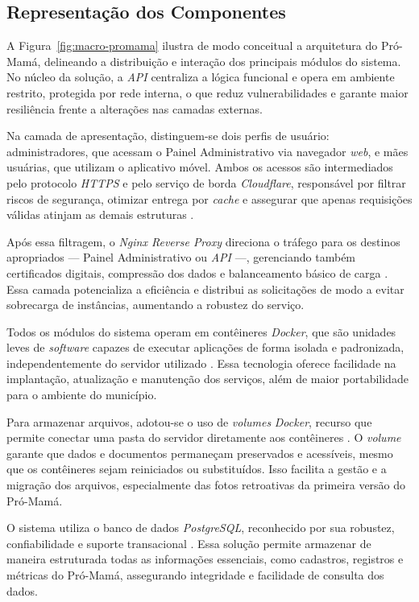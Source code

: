 \subsection{Representação dos Componentes}

A Figura~\ref{fig:macro-promama} ilustra de modo conceitual a arquitetura do Pró-Mamá, delineando a distribuição e interação dos principais módulos do sistema. No núcleo da solução, a \emph{API} centraliza a lógica funcional e opera em ambiente restrito, protegida por rede interna, o que reduz vulnerabilidades e garante maior resiliência frente a alterações nas camadas externas.

Na camada de apresentação, distinguem-se dois perfis de usuário: administradores, que acessam o Painel Administrativo via navegador \emph{web}, e mães usuárias, que utilizam o aplicativo móvel. Ambos os acessos são intermediados pelo protocolo \emph{HTTPS} e pelo serviço de borda \emph{Cloudflare}, responsável por filtrar riscos de segurança, otimizar entrega por \emph{cache} e assegurar que apenas requisições válidas atinjam as demais estruturas \cite{cloudflarefundamentals}.

Após essa filtragem, o \emph{Nginx Reverse Proxy} direciona o tráfego para os destinos apropriados — Painel Administrativo ou \emph{API} —, gerenciando também certificados digitais, compressão dos dados e balanceamento básico de carga \cite{nginxloadbalancer}. Essa camada potencializa a eficiência e distribui as solicitações de modo a evitar sobrecarga de instâncias, aumentando a robustez do serviço.

Todos os módulos do sistema operam em contêineres \emph{Docker}, que são unidades leves de \emph{software} capazes de executar aplicações de forma isolada e padronizada, independentemente do servidor utilizado \cite{dockerdocs}. Essa tecnologia oferece facilidade na implantação, atualização e manutenção dos serviços, além de maior portabilidade para o ambiente do município.

Para armazenar arquivos, adotou-se o uso de \emph{volumes} \emph{Docker}, recurso que permite conectar uma pasta do servidor diretamente aos contêineres \cite{dockerdocs}. O \emph{volume} garante que dados e documentos permaneçam preservados e acessíveis, mesmo que os contêineres sejam reiniciados ou substituídos. Isso facilita a gestão e a migração dos arquivos, especialmente das fotos retroativas da primeira versão do Pró-Mamá.

O sistema utiliza o banco de dados \emph{PostgreSQL}, reconhecido por sua robustez, confiabilidade e suporte transacional \cite{postgresdocs}. Essa solução permite armazenar de maneira estruturada todas as informações essenciais, como cadastros, registros e métricas do Pró-Mamá, assegurando integridade e facilidade de consulta dos dados.


